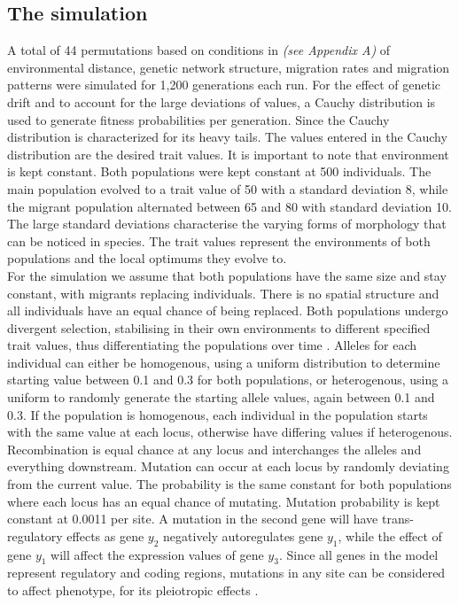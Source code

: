 \subsection{The simulation}
A total of 44 permutations based on conditions in \textit{(see Appendix A)} of environmental distance, genetic network structure, migration rates and migration patterns were simulated for 1,200 generations each run. For the effect of genetic drift and to account for the large deviations of values, a Cauchy distribution is used to generate fitness probabilities per generation. Since the Cauchy distribution is characterized for its heavy tails. The values entered in the Cauchy distribution are the desired trait values. It is important to note that environment is kept constant. Both populations were kept constant at 500 individuals. The main population evolved to a trait value of 50 with a standard deviation 8, while the migrant population alternated between 65 and 80 with standard deviation 10. The large standard deviations characterise the varying forms of morphology that can be noticed in species. The trait values represent the environments of both populations and the local optimums they evolve to.\\
For the simulation we assume that both populations have the same size and stay constant, with migrants replacing individuals.  There is no spatial structure and all individuals have an equal chance of being replaced. Both populations undergo divergent selection, stabilising in their own environments to different specified trait values, thus differentiating the populations over time \cite{sato2006effect}. Alleles for each individual can either be homogenous, using a uniform distribution to determine starting value between 0.1 and 0.3 for both populations, or heterogenous, using a uniform to randomly generate the starting allele values, again between 0.1 and 0.3. If the population is homogenous, each individual in the population starts with the same value at each locus, otherwise have differing values if heterogenous.
Recombination is equal chance at any locus and interchanges the alleles and everything downstream. Mutation can occur at each locus by randomly deviating from the current value. The probability is the same constant for both populations where each locus has an equal chance of mutating. Mutation probability is kept constant at 0.0011 per site. A mutation in the second gene will have trans-regulatory effects as gene $y_2$ negatively autoregulates gene $y_1$, while the effect of gene $y_1$ will affect the expression values of gene $y_3$. Since all genes in the model represent regulatory and coding regions, mutations in any site can be considered to affect phenotype, for its pleiotropic effects \cite{rice2019evolution; landry2007genetic}.\\
